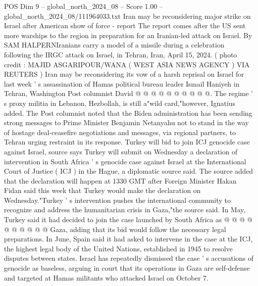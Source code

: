 \begin{textsample}{POS Dim 9 – global\_north\_2024\_08 – Score 1.00 – global\_north\_2024\_08/111964033.txt}
Iran may be reconsidering major strike on Israel after American show of force - report The report comes after the US sent more warships to the region in preparation for an Iranian-led attack on Israel.
By SAM HALPERNIranians carry a model of a missile during a celebration following the IRGC attack on Israel, in Tehran, Iran, April 15, 2024. ( photo credit : MAJID ASGARIPOUR/WANA ( WEST ASIA NEWS AGENCY ) VIA REUTERS ) Iran may be reconsidering its vow of a harsh reprisal on Israel for last week ' s assassination of Hamas political bureau leader Ismail Haniyeh in Tehran, Washington Post columnist David @ @ @ @ @ @ @ @ @ @.
The regime ' s proxy militia in Lebanon, Hezbollah, is still a"wild card,"however, Ignatius added.
The Post columnist noted that the Biden administration has been sending strong messages to Prime Minister Benjamin Netanyahu not to stand in the way of hostage deal-ceasefire negotiations and messages, via regional partners, to Tehran urging restraint in its response.
Turkey will bid to join ICJ genocide case against Israel, source says Turkey will submit on Wednesday a declaration of intervention in South Africa ' s genocide case against Israel at the International Court of Justice ( ICJ ) in the Hague, a diplomatic source said.
The source added that the declaration will happen at 1330 GMT after Foreign Minister Hakan Fidan said this week that Turkey would make the declaration on Wednesday."Turkey ' s intervention pushes the international community to recognize and address the humanitarian crisis in Gaza,"the source said.
In May, Turkey said it had decided to join the case launched by South Africa as @ @ @ @ @ @ @ @ @ @ Gaza, adding that its bid would follow the necessary legal preparations.
In June, Spain said it had asked to intervene in the case at the ICJ, the highest legal body of the United Nations, established in 1945 to resolve disputes between states.
Israel has repeatedly dismissed the case ' s accusations of genocide as baseless, arguing in court that its operations in Gaza are self-defense and targeted at Hamas militants who attacked Israel on October 7.

\end{textsample}

